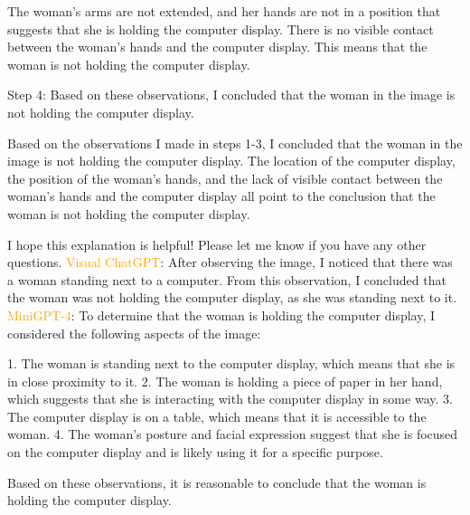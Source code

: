 \begin{enumerate}
        The woman's arms are not extended, and her hands are not in a position that suggests that she is holding the computer display. There is no visible contact between the woman's hands and the computer display. This means that the woman is not holding the computer display.
        
        Step 4: Based on these observations, I concluded that the woman in the image is not holding the computer display.
        
        Based on the observations I made in steps 1-3, I concluded that the woman in the image is not holding the computer display. The location of the computer display, the position of the woman's hands, and the lack of visible contact between the woman's hands and the computer display all point to the conclusion that the woman is not holding the computer display.
        
        I hope this explanation is helpful! Please let me know if you have any other questions.
        \subitem \textcolor{orange}{Visual ChatGPT}: After observing the image, I noticed that there was a woman standing next to a computer. From this observation, I concluded that the woman was not holding the computer display, as she was standing next to it.
        \subitem \textcolor{orange}{MiniGPT-4}: To determine that the woman is holding the computer display, I considered the following aspects of the image:

        1. The woman is standing next to the computer display, which means that she is in close proximity to it.
        2. The woman is holding a piece of paper in her hand, which suggests that she is interacting with the computer display in some way.
        3. The computer display is on a table, which means that it is accessible to the woman.
        4. The woman’s posture and facial expression suggest that she is focused on the computer display and is likely using it for a specific purpose.
        
        Based on these observations, it is reasonable to conclude that the woman is holding the computer display.
    \end{enumerate}